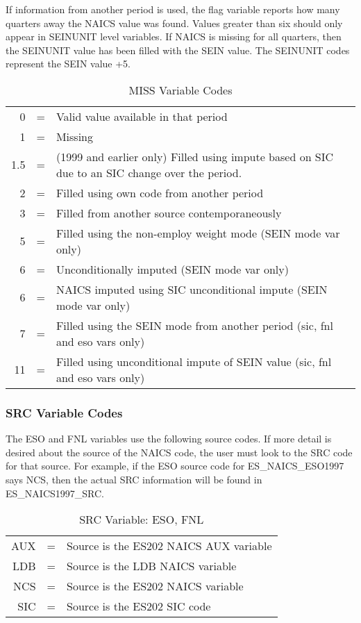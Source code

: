 If information from another period 
is used, the flag variable reports how many quarters away the NAICS value 
was found. Values greater than six should only appear in SEINUNIT level variables. If 
NAICS is missing for all quarters, then the SEINUNIT value has been filled 
with the SEIN value. The SEINUNIT codes  represent the SEIN value +5.




\begin{table}[htbp]
  \centering
\caption{MISS Variable Codes}
  \begin{tabular}{rcp{10cm}}
\\
0&=& Valid value available in that period\\
1&=& Missing\\
1.5&=& (1999 and earlier only) Filled using impute based on SIC due to an SIC
change over the period.\\
2&=& Filled using own code from another period\\
3&=& Filled from another source contemporaneously\\
5&=& Filled using the non-employ weight mode (SEIN mode var only)\\
6&=& Unconditionally imputed (SEIN mode var only)\\
6&=& NAICS imputed using SIC unconditional impute (SEIN mode var only)\\
7&=& Filled using the SEIN mode from another period (sic, fnl and eso vars 
only)\\
11&=& Filled using unconditional impute of SEIN value (sic, fnl and eso vars 
only)\\

  \end{tabular}
  \label{tab:miss}
\end{table}





\subsubsection{SRC Variable Codes}

The ESO and FNL variables use the following source codes. If more detail is 
desired about the source of the NAICS code, the user must look to the SRC 
code for that source. For example, if the ESO source code for 
ES{\_}NAICS{\_}ESO1997 says NCS, then the actual SRC information will be 
found in ES{\_}NAICS1997{\_}SRC.

\begin{table}[htbp]
  \centering
  \caption{SRC Variable: ESO, FNL}
  \label{tab:src1}
  \begin{tabular}{rcp{10cm}}
\\
AUX&=& Source is the ES202 NAICS AUX variable\\
LDB&=& Source is the LDB NAICS variable      \\
NCS&=& Source is the ES202 NAICS variable    \\
SIC&=& Source is the ES202 SIC code          \\  

  \end{tabular}
\end{table}




